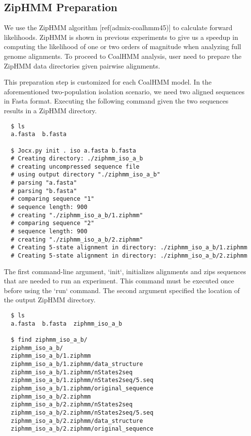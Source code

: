\subsection{ZipHMM Preparation}

We use the ZipHMM algorithm [ref(admix-coalhmm45)] to calculate forward
likelihoods. ZipHMM is shown in previous experiments to give us a speedup in
computing the likelihood of one or two orders of magnitude when analyzing full
genome alignments. To proceed to CoalHMM analysis, user need to prepare the
ZipHMM data directories given pairwise alignments.

This preparation step is customized for each CoalHMM model. In the
aforementioned two-population isolation scenario, we need two aligned sequences
in Fasta format. Executing the following command given the two sequences results
in a ZipHMM directory.

{\small{}\begin{verbatim}
  $ ls
  a.fasta  b.fasta

  $ Jocx.py init . iso a.fasta b.fasta
  # Creating directory: ./ziphmm_iso_a_b
  # creating uncompressed sequence file
  # using output directory "./ziphmm_iso_a_b"
  # parsing "a.fasta"
  # parsing "b.fasta"
  # comparing sequence "1"
  # sequence length: 900
  # creating "./ziphmm_iso_a_b/1.ziphmm"
  # comparing sequence "2"
  # sequence length: 900
  # creating "./ziphmm_iso_a_b/2.ziphmm"
  # Creating 5-state alignment in directory: ./ziphmm_iso_a_b/1.ziphmm
  # Creating 5-state alignment in directory: ./ziphmm_iso_a_b/2.ziphmm
\end{verbatim}}

The first command-line argument, ‘init‘, initializes alignments and zips
sequences that are needed to run an experiment. This command must be executed
once before using the ‘run‘ command. The second argument specified the location
of the output ZipHMM directory.

{\small{}\begin{verbatim}
  $ ls
  a.fasta  b.fasta  ziphmm_iso_a_b

  $ find ziphmm_iso_a_b/
  ziphmm_iso_a_b/
  ziphmm_iso_a_b/1.ziphmm
  ziphmm_iso_a_b/1.ziphmm/data_structure
  ziphmm_iso_a_b/1.ziphmm/nStates2seq
  ziphmm_iso_a_b/1.ziphmm/nStates2seq/5.seq
  ziphmm_iso_a_b/1.ziphmm/original_sequence
  ziphmm_iso_a_b/2.ziphmm
  ziphmm_iso_a_b/2.ziphmm/nStates2seq
  ziphmm_iso_a_b/2.ziphmm/nStates2seq/5.seq
  ziphmm_iso_a_b/2.ziphmm/data_structure
  ziphmm_iso_a_b/2.ziphmm/original_sequence
\end{verbatim}}

